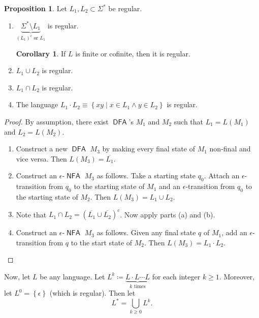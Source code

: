 \documentclass[10pt,letterpaper,cm]{nupset}
\theoremstyle{definition}
\theoremstyle{theorem}
\newtheorem{prop}[definition]{Proposition}
\newtheorem{corollary}[definition]{Corollary}
\theoremstyle{remark}
\newcommand{\1}{\mathbf{1}}
\newcommand{\0}{\vec 0}
\DeclareMathOperator{\DFA}{\mathsf{DFA}}
\DeclareMathOperator{\NFA}{\mathsf{NFA}}
\begin{document}
\begin{prop} Let $L_1, L_2\subset \Sigma^{\ast}$ be regular. 
\begin{enumerate}[label=(\alph*)]
\item $\underbrace{\Sigma^{\ast} \setminus L_1}_{\text{$\left(L_1\right)^c$ or $\overline{L_1}$}}$ is regular.
\begin{corollary}
If $L$ is finite or cofinite, then it is regular.
\end{corollary}
\item $L_1 \cup L_2$ is regular.
\item $L_1 \cap L_2$ is regular. 
\item The language $L_1\cdot L_2 \equiv  \left\{xy \mid x\in L_1 \land y\in L_2\right\}$ is regular. 
\end{enumerate}
\end{prop} 
\begin{proof} By assumption, there exist $\DFA$'s $M_1$ and $M_2$ such that $L_1 = L(M_1)$ and $L_2 = L(M_2)$.
\begin{enumerate}[label=(\alph*)]
\item Construct a new $\DFA$ $M_3$ by making every final state of $M_1$ non-final and vice versa. Then $L(M_3) = \overline{L_1}$.
\item Construct an $\epsilon{\text{-}}\NFA$ $M_3$ as follows. Take a starting state $q_0$. Attach  an $\epsilon$-transition  from $q_0$ to the starting state of $M_1$  and  an $\epsilon$-transition from $q_0$ to the starting state of $M_2$. Then $L(M_3) = L_1 \cup L_2$.
\item Note that $L_1 \cap L_2 = \left(\overline{L_1} \cup \overline{L_2}\right)^c$.  Now apply parts (a) and (b).
\item Construct an $\epsilon{\text{-}}\NFA$ $M_3$ as follows. Given any final state $q$ of $M_1$, add an $\epsilon$-transition from $q$ to the start state of $M_2$. Then $L(M_3) = L_1\cdot L_2$.
\end{enumerate}
\end{proof}

\medskip

Now, let $L$ be any language. Let $L^k \coloneqq \underbrace{L\cdot L \cdots L}_{k \text{ times}}$ for each integer $k\geq 1$. Moreover, let $L^0 = \left\{\epsilon\right\}$ (which is regular). Then let $$L^{\ast} = \bigcup_{k\geq 0} L^k.$$

\medskip
\end{document}

